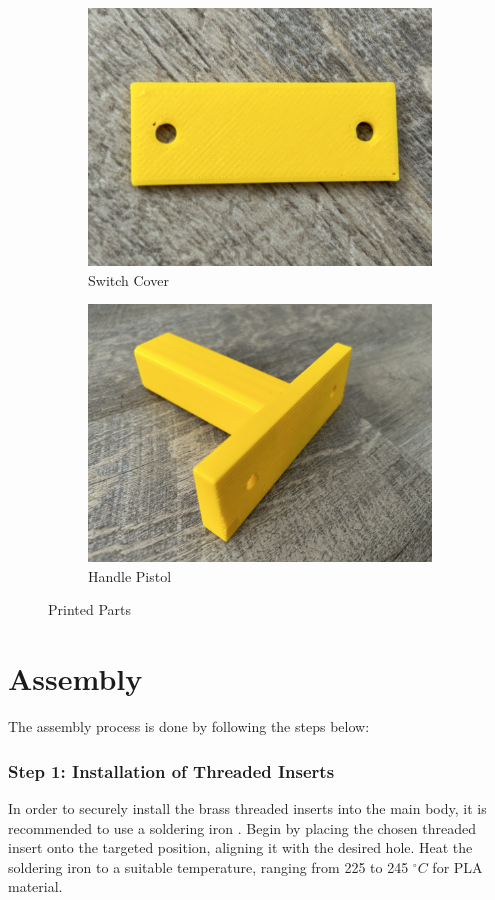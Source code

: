 \begin{figure}[h!]
\begin{subfigure}[c]{0.45\textwidth}
        \label{fig:printed_battery_cover}
    \end{subfigure}
    \begin{subfigure}[c]{0.45\textwidth}
        \begin{minipage}{\textwidth}
            \centering
            \includegraphics[height=4 cm]{texs/Part1/chapter5/image/res_switch.jpg}
        \end{minipage}
        \caption{Switch Cover}
        \label{fig:printed_switch_cover}
    \end{subfigure}
    \begin{subfigure}[c]{0.45\textwidth}
        \begin{minipage}{\textwidth}
            \centering
            \includegraphics[height=4 cm]{texs/Part1/chapter5/image/res_grip.jpg}
        \end{minipage}
        \caption{Handle Pistol}
        \label{fig:printed_handle_pistol}
    \end{subfigure}
    \caption{Printed Parts}
    \label{fig:printedparts}
\end{figure}

\section{Assembly}
\label{sec:assembly}

The assembly process is done by following the steps below:

\subsubsection{Step 1: Installation of Threaded Inserts}
In order to securely install the brass threaded inserts into the main body, it is recommended to use a soldering iron \cite{Hermann23}. Begin by placing the chosen threaded insert onto the targeted position, aligning it with the desired hole. Heat the soldering iron to a suitable temperature, ranging from 225 to 245 $^{\circ}C$ for PLA material.

